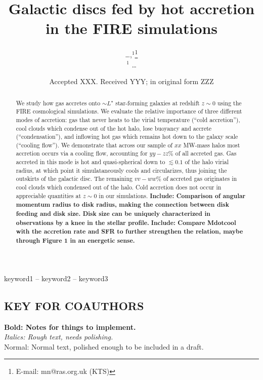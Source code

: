 \documentclass[fleqn,usenatbib]{mnras}
\title[Hot Accretion in FIRE]{Galactic discs fed by hot accretion in the FIRE simulations}
\author[\ldots]{
\ldots,$^{1}$\thanks{E-mail: mn@ras.org.uk (KTS)}
\\
$^1$ \ldots
}
\date{Accepted XXX. Received YYY; in original form ZZZ}
\begin{document}
\label{firstpage}
\pagerange{\pageref{firstpage}--\pageref{lastpage}}
\maketitle

\begin{abstract}
We study how gas accretes onto $\sim L^\star$ star-forming galaxies at redshift $z\sim0$ using the FIRE cosmological simulations. We evaluate the relative importance of three different modes of accretion: 
gas that never heats to the virial temperature (``cold accretion''), 
cool clouds which condense out of the hot halo, lose buoyancy and accrete  (``condensation''), 
and inflowing hot gas which remains hot down to the galaxy scale (``cooling flow''). 
We demonstrate that across our sample of $xx$ MW-mass halos most accretion occurs via a cooling flow, accounting for $yy-zz\%$ of all accreted gas. Gas accreted in this mode is hot and quasi-spherical down to $\lesssim 0.1$ of the halo virial radius, at which point it simulataneously cools and circularizes, thus joining the outskirts of the galactic disc. 
The remaining $vv-ww\%$ of accreted gas originates in cool clouds which condensed out of the halo. Cold accretion does not occur in appreciable quantities at $z\sim0$ in our simulations. 
\textbf{
Include: Comparison of angular momentum radius to disk radius, making the connection between disk feeding and disk size.
Disk size can be uniquely characterized in observations by a knee in the stellar profile.
}
\textbf{
Include: Compare Mdotcool with the accretion rate and SFR to further strengthen the relation, maybe through Figure 1 in an energetic sense.
}
\end{abstract}

\begin{keywords}
keyword1 -- keyword2 -- keyword3
\end{keywords}



\subsection{ KEY FOR COAUTHORS}
\textbf{Bold: Notes for things to implement.} \\
\textit{Italics: Rough text, needs polishing.} \\
Normal: Normal text, polished enough to be included in a draft.
\end{document}
